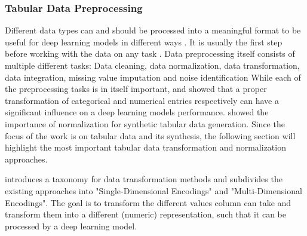 \subsubsection{Tabular Data Preprocessing}
\label{sec:preprocessing}

Different data types can and should be processed into a meaningful format to be useful for deep learning \glspl{model} in different ways \cite{fan2020RelationalDataSynthesisa, lederrey2022DATGANIntegratingExperta}.
It is usually the first step before working with the data on any task \cite{izonin2022TwoStepDataNormalization}.
Data preprocessing itself consists of multiple different tasks: Data cleaning, data normalization, data transformation, data integration, missing value imputation and noise identification \cite{garcia2016BigDataPreprocessing}
While each of the preprocessing tasks is in itself important, 
\cite{fitkov-norris2012EvaluatingImpactCategorical} and \cite{gorishniy2022EmbeddingsNumericalFeatures} showed that a proper transformation of categorical and numerical entries respectively can have a significant influence on a deep learning \glspl{model} performance.
\cite{xu2019ModelingTabularData} showed the importance of normalization for synthetic tabular data generation.
Since the focus of the work is on tabular data and its synthesis, the following section will highlight the most important tabular data transformation and normalization approaches.

\label{sec:dataTransformation}

\cite{borisov2022DeepNeuralNetworks} introduces a taxonomy for data transformation methods and subdivides the existing approaches into "Single-Dimensional Encodings" and "Multi-Dimensional Encodings".
The goal is to transform the different values column can take and transform them into a different (numeric) representation, such that it can be processed by a deep learning \gls{model}.

